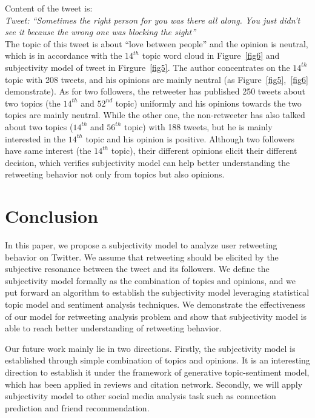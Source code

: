 \documentclass[twocolumn]{svjour3}          %
\begin{document}
Content of the tweet is:\\
\textit{Tweet: ``Sometimes the right person for you was there all along. You just didn’t see it because the wrong one was blocking the sight''} \\
The topic of this tweet is about ``love between people'' and the opinion is neutral, which is in accordance with the $ 14^{th} $ topic word cloud in Figure~\ref{fig6} and subjectivity model of tweet in Firgure~\ref{fig5}.
The author concentrates on the $ 14^{th} $ topic with 208 tweets, and his opinions are mainly neutral (as Figure~\ref{fig5},~\ref{fig6} demonstrate). 
As for two followers, the retweeter has published 250 tweets about two topics (the $ 14^{th} $ and $ 52^{nd} $ topic) uniformly and his opinions towards the two topics are mainly neutral. 
While the other one, the non-retweeter has also talked about two topics ($ 14^{th} $ and $ 56^{th} $ topic) with 188 tweets, but he is mainly interested in the $ 14^{th} $ topic and his opinion is positive.
Although two followers have same interest (the $ 14^{th} $ topic), their different opinions elicit their different decision, which verifies subjectivity model can help better understanding the retweeting behavior not only from topics but also opinions. 

\section{Conclusion}
In this paper, we propose a subjectivity model to analyze user retweeting behavior on Twitter. We assume that retweeting should be elicited by the subjective resonance between the tweet and its followers. 
We define the subjectivity model formally as the combination of topics and opinions, and we put forward an algorithm to establish the subjectivity model leveraging statistical topic model and sentiment analysis techniques. 
We demonstrate the effectiveness of our model for retweeting analysis problem and show that subjectivity model is able to reach better understanding of retweeting behavior. 

Our future work mainly lie in two directions. 
Firstly, the subjectivity model is established through simple combination of topics and opinions. It is an interesting direction to establish it under the framework of generative topic-sentiment model, which has been applied in reviews and citation network. 
Secondly, we will apply subjectivity model to other social media analysis task such as connection prediction and friend recommendation. 








\end{document}

